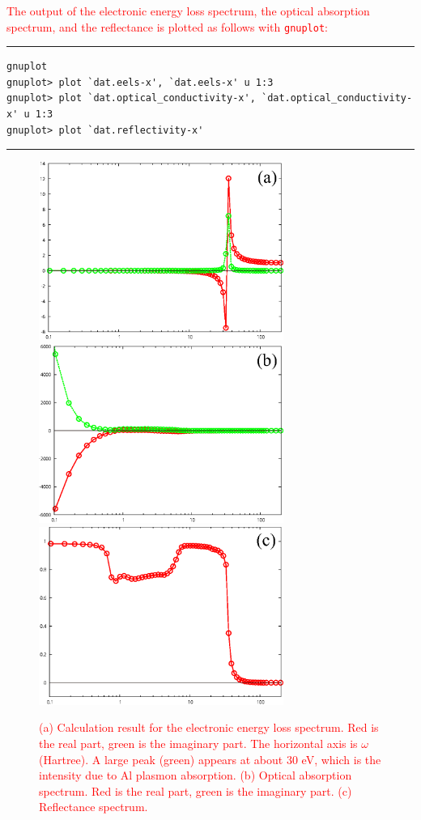 \documentclass{article}
\newcommand{\tr}[1]{\textcolor{red}{#1}}
\begin{document}
\tr{The output of the electronic energy loss spectrum, the optical absorption spectrum, and the reflectance is plotted as follows with {\tt gnuplot}:} 
\vspace{3mm}\hrule
\begin{verbatim} 
gnuplot 
gnuplot> plot `dat.eels-x', `dat.eels-x' u 1:3 
gnuplot> plot `dat.optical_conductivity-x', `dat.optical_conductivity-x' u 1:3 
gnuplot> plot `dat.reflectivity-x' 
\end{verbatim}
\hrule\vspace{3mm}
\begin{figure}[H] 
\centering
\includegraphics[width=8cm]{eels-Al.eps}
\includegraphics[width=8cm]{optical_conductivity-Al.eps}
\includegraphics[width=8cm]{reflectivity-Al.eps}
\caption{\tr{(a) Calculation result for the electronic energy loss spectrum. Red is the real part, green is the imaginary part. The horizontal axis is $\omega$ (Hartree). A large peak (green) appears at about 30 eV, which is the intensity due to Al plasmon absorption. (b) Optical absorption spectrum. Red is the real part, green is the imaginary part. (c) Reflectance spectrum.}} 
\label{eels}
\end{figure}
\end{document}
